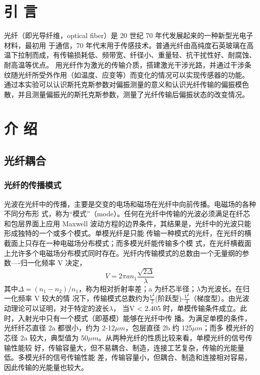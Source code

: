 \documentclass[10pt,a4paper,twoside,UTF8]{ctexart}
\begin{document}


\section{引 \quad 言}
光纤（即光导纤维，optical fiber）是 20 世纪 70 年代发展起来的一种新型光电子材料，最初用
于通信，70 年代末用于传感技术。普通光纤由高纯度石英玻璃在高温下拉制而成，有传输损耗低、频带宽、纤径小、重量轻、抗干扰性好、耐腐蚀、耐高温等优点。
用光纤作为激光的传输介质，搭建激光干涉光路，并通过干涉条纹随光纤所受外作用（如温度、应变等）而变化的情况可以实现传感器的功能。
通过本实验可以认识斯托克斯参数对偏振测量的意义和认识光纤传输的偏振模色散，并且测量偏振光的斯托克斯参数，测量了光纤传输后偏振状态的改变情况。

\section{介 \quad 绍}
\subsection{光纤耦合}
\subsubsection{光纤的传播模式}
光波在光纤中的传播，主要是交变的电场和磁场在光纤中向前传播。电磁场的各种不同分布形
式，称为“模式”（mode）。任何在光纤中传输的光波必须满足在纤芯和包层界面上应用 Maxwell
波动方程的边界条件，其结果是，光纤中的光波只能形成独特的一个或多个模式。单模光纤是只能
传输一种模式的光纤，在光纤的横截面上只存在一种电磁场分布模式；而多模光纤能传输多个模
式，在光纤横截面上允许多个电磁场分布模式同时存在。光纤内传输模式的总数由一个无量纲的参
数----归一化频率 V 决定，
\begin{equation}
	\label{eq:1}
	V=2\pi a n_1 \frac{\sqrt{2\varDelta}}{\lambda}
\end{equation}
其中$\varDelta=(n_1-n_2)/n_1$，称为相对折射率差；a 为纤芯半径；$\lambda$为光波长。在归一化频率 V 较大的情
况下，传输模式总数约为$\frac{V^{2}}{2}$(阶跃型)-$\frac{V^{2}}{4}$（梯度型）。由光波动理论可以证明，对于特定的波长$\lambda$，
当V < 2.405 时，单模传输条件成立。此时，入射光中只有一个模式（即基模）能够在光纤中传
播。为满足单模的条件，光纤纤芯直径 2a 都很小，约为 2-12$\mu m$，包层直径 2b 约 125$\mu m$；而多
模光纤的芯径 2a 较大，典型值为 50$\mu m$。从两种光纤的性质比较来看，单模光纤的信号传输性能较
好，传输容量大，但不易耦合、制造，连接工艺复杂，传输的光能量低。多模光纤的信号传输性能
差，传输容量小，但耦合、制造和连接相对容易，因此传输的光能量也较大。
\end{document}
